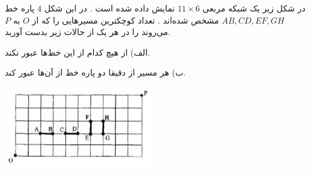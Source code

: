 \EXERCISE
در شکل زیر یک شبکه مربعی 
$11 \times 6$
نمایش داده شده است . در این شکل 
$4$
 پاره خط 
$AB, CD, EF, GH$
  مشخص شده‌اند . تعداد کوچکترین مسیرهایی را که از 
$O$
  به 
$P$
   می‌روند را در هر یک از
حالات زیر بدست آورید.

الف) از هیچ‌ کدام از این خط‌ها عبور نکند.

ب) هر مسیر از دقیقا دو پاره خط از آن‌ها عبور کند.

    \begin{center}
     	\includegraphics[scale=0.7]{./5.png}
    \end{center}